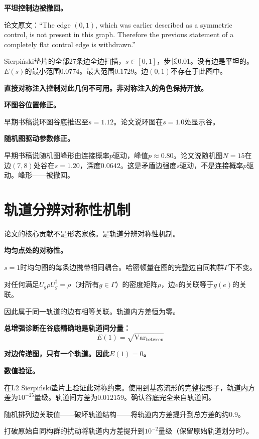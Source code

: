 \documentclass[11pt,a4paper]{book}
\theoremstyle{definition}
\begin{document}
\textbf{平坦控制边被撤回。}

论文原文：“The edge $(0,1)$, which was earlier described as a symmetric control, is not present in this graph. Therefore the previous statement of a completely flat control edge is withdrawn.”

Sierpiński垫片的全部27条边全边扫描，$s\in[0,1]$，步长0.01。没有边是平坦的。$E(s)$的最小范围$0.0774$。最大范围$0.1729$。边$(0,1)$不存在于此图中。

\textbf{直接对称注入控制对此几何不可用。非对称注入的角色保持开放。}

\textbf{环图谷位置修正。}

早期书稿说环图谷底推迟至$s=1.12$。论文说环图在$s=1.0$处显示谷。

\textbf{随机图驱动参数修正。}

早期书稿说随机图峰形由连接概率$p$驱动，峰值$p\approx0.80$。论文说随机图$N=15$在边$(7,8)$处谷在$s=1.20$，深度$0.0642$。这是矛盾边强度$s$驱动，不是连接概率$p$驱动。峰形——被撤回。

\section{轨道分辨对称性机制}

论文的核心贡献不是形态家族。是轨道分辨对称性机制。

\textbf{均匀点处的对称性。}

$s=1$时均匀图的每条边携带相同耦合。哈密顿量在图的完整边自同构群$\Gamma$下不变。

对任何满足$U_g \rho U_g^\dagger = \rho$（对所有$g\in\Gamma$）的密度矩阵$\rho$，边$e$的关联等于$g(e)$的关联。

因此属于同一轨道的边有相等关联。轨道内方差恒为零。

\textbf{总增强诊断在谷底精确地是轨道间分量：}
\begin{equation}
E(1) = \sqrt{\text{Var}_{\text{between}}}
\end{equation}

\textbf{对边传递图，只有一个轨道。因此$E(1)=0$。}

\textbf{数值验证。}

在L2 Sierpiński垫片上验证此对称约束。使用到基态流形的完整投影子，轨道内方差为$10^{-25}$量级。轨道间方差为$0.012159$。确认谷底完全来自轨道间。

随机排列边关联值——破坏轨道结构——将轨道内方差提升到总方差的约$0.9$。

打破原始自同构群的扰动将轨道内方差提升到$10^{-2}$量级（保留原始轨道划分时）。
\end{document}
